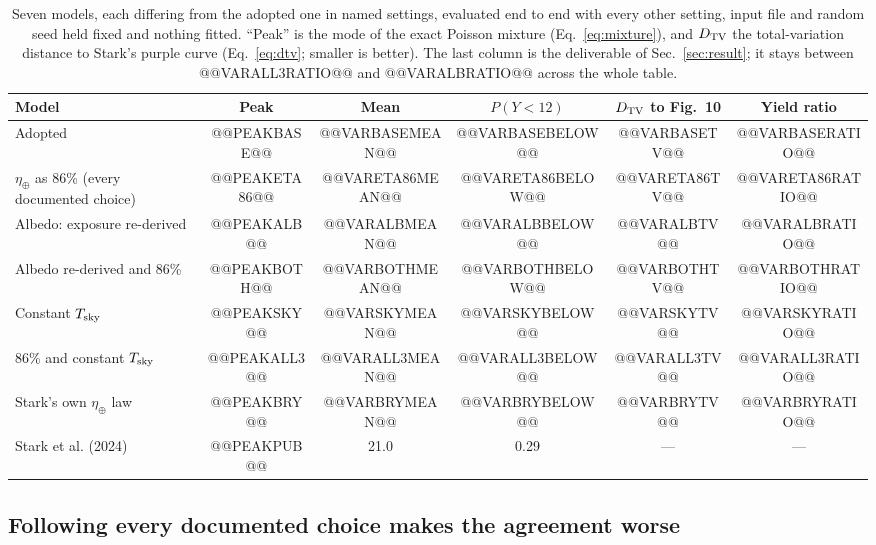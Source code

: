 \documentclass[11pt,a4paper]{article}
\begin{document}
\begin{table}[htbp]
\centering
\small
\begin{tabular}{lccccc}
\toprule
\textbf{Model} & \textbf{Peak} & \textbf{Mean} & \textbf{$P(Y<12)$} & \textbf{$D_{\rm TV}$ to Fig.~10} &
\textbf{Yield ratio} \\
\midrule
Adopted                              & @@PEAKBASE@@  & @@VARBASEMEAN@@  & @@VARBASEBELOW@@  & @@VARBASETV@@  & @@VARBASERATIO@@ \\
$\eta_\oplus$ as 86\% (every documented choice) & @@PEAKETA86@@ & @@VARETA86MEAN@@ & @@VARETA86BELOW@@ & @@VARETA86TV@@ & @@VARETA86RATIO@@ \\
Albedo: exposure re-derived          & @@PEAKALB@@   & @@VARALBMEAN@@   & @@VARALBBELOW@@   & @@VARALBTV@@   & @@VARALBRATIO@@ \\
Albedo re-derived and 86\%           & @@PEAKBOTH@@  & @@VARBOTHMEAN@@  & @@VARBOTHBELOW@@  & @@VARBOTHTV@@  & @@VARBOTHRATIO@@ \\
Constant $T_{\rm sky}$               & @@PEAKSKY@@   & @@VARSKYMEAN@@   & @@VARSKYBELOW@@   & @@VARSKYTV@@   & @@VARSKYRATIO@@ \\
86\% and constant $T_{\rm sky}$      & @@PEAKALL3@@  & @@VARALL3MEAN@@  & @@VARALL3BELOW@@  & @@VARALL3TV@@  & @@VARALL3RATIO@@ \\
Stark's own $\eta_\oplus$ law        & @@PEAKBRY@@   & @@VARBRYMEAN@@   & @@VARBRYBELOW@@   & @@VARBRYTV@@   & @@VARBRYRATIO@@ \\
\midrule
Stark et al. (2024)                    & @@PEAKPUB@@   & 21.0             & 0.29              & ---            & --- \\
\bottomrule
\end{tabular}
\caption{Seven models, each differing from the adopted one in named settings, evaluated end to
end with every other setting, input file and random seed held fixed and nothing fitted.
``Peak'' is the mode of the exact Poisson mixture (Eq.~\ref{eq:mixture}), and $D_{\rm TV}$ the
total-variation distance to Stark's purple curve (Eq.~\ref{eq:dtv}; smaller is better). The last
column is the deliverable of
Sec.~\ref{sec:result}; it stays between @@VARALL3RATIO@@ and @@VARALBRATIO@@ across the whole
table.}
\label{tab:variants}
\end{table}

\subsection{Following every documented choice makes the agreement worse}
\end{document}
